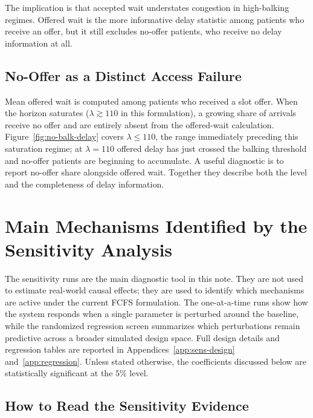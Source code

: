 \documentclass[11pt]{article}
\begin{document}
The implication is that accepted wait understates congestion in
high-balking regimes. Offered wait is the more informative delay statistic among patients who
receive an offer, but it still excludes no-offer patients, who receive no
delay information at all.

\subsection{No-Offer as a Distinct Access Failure}

Mean offered wait is computed among patients who received a slot offer.
When the horizon saturates ($\lambda \gtrsim 110$ in this formulation),
a growing share of arrivals receive no offer and are entirely absent from
the offered-wait calculation. Figure~\ref{fig:no-balk-delay} covers
$\lambda \leq 110$, the range immediately preceding this saturation
regime; at $\lambda = 110$ offered delay has just crossed the balking
threshold and no-offer patients are beginning to accumulate. A useful
diagnostic is to report no-offer share alongside offered wait. Together
they describe both the level and the completeness of delay information.

\section{Main Mechanisms Identified by the Sensitivity Analysis}
\label{sec:sensitivity}

The sensitivity runs are the main diagnostic tool in this note. They are not
used to estimate real-world causal effects; they are used to identify which
mechanisms are active under the current FCFS formulation. The one-at-a-time
runs show how the system responds when a single parameter is perturbed around
the baseline, while the randomized regression screen summarizes which
perturbations remain predictive across a broader simulated design space. Full
design details and regression tables are reported in
Appendices~\ref{app:sens-design} and~\ref{app:regression}. Unless stated
otherwise, the coefficients discussed below are statistically significant at
the \(5\%\) level.

\subsection{How to Read the Sensitivity Evidence}
\end{document}
